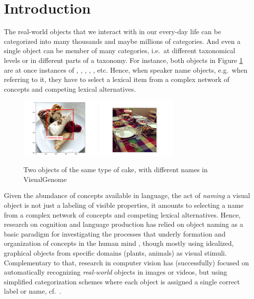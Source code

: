 \section{Introduction}

The real-world objects that we interact with in our every-day life can be categorized into many thousands and maybe millions of categories. And even a single object can be member of many categories, i.e.\ at different taxonomical levels or in different parts of a taxonomy. For instance, both objects in Figure \ref{fig:cake} are at once instances of , , , , ,  etc. Hence, when speaker name objects, e.g.\ when referring to it, they have to select a lexical item from a complex network of concepts and competing lexical alternatives.

\begin{figure}[htbp]
\begin{center}
\includegraphics[height=3cm]{Figures/cheescake.png}
\includegraphics[height=3cm]{Figures/cheesecak2.pdf}
\caption{Two objects of the same type of cake, with different names in VisualGenome}
\label{fig:cake}
\end{center}
\end{figure}


Given the abundance of concepts available in language, the act of \textit{naming} a visual object is not just a labeling of visible properties, it amounts to selecting a name from a complex network of concepts and competing lexical alternatives.
Hence, research on cognition and language production has relied on object naming as a basic paradigm for investigating the processes that underly formation and organization of concepts in the human mind  \cite{rosch1976basic} , though mostly using idealized, graphical objects from specific domains (plants, animals) as visual stimuli.
Complementary to that, research in computer vision has (successfully) focused on automatically recognizing \textit{real-world} objects in images or videos, but using simplified categorization schemes where each object is assigned a single correct label or name, cf.\ \cite{googlenet}. %

